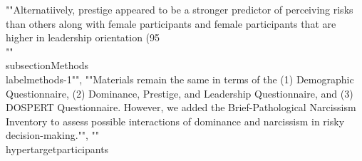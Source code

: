 {{{{{{{{{{{{{{{{{{""Alternatiively, prestige appeared to be a stronger predictor of perceiving risks than others along with female participants and female participants that are higher in leadership orientation (95\\%
""\\subsection{Methods}\\label{methods-1}}"", ""Materials remain the same in terms of the (1) Demographic Questionnaire, (2) Dominance, Prestige, and Leadership Questionnaire, and (3) DOSPERT Questionnaire. However, we added the Brief-Pathological Narcissism Inventory to assess possible interactions of dominance and narcissism in risky decision-making."", ""\\hypertarget{participants}{%
}}}}}}}}}}}}}}}}}}

